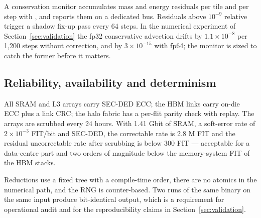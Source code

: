 A conservation monitor accumulates mass and energy residuals per tile and per step with
, and reports them on a dedicated bus. Residuals above $10^{-9}$ relative trigger
a shadow fix-up pass every 64 steps. In the numerical experiment of Section~\ref{sec:validation}
the fp32 conservative advection drifts by $1.1\times10^{-8}$ per 1,200 steps without correction,
and by $3\times10^{-15}$ with fp64; the monitor is sized to catch the former before it matters.

\subsection{Reliability, availability and determinism}
All SRAM and L3 arrays carry SEC-DED ECC; the HBM links carry on-die ECC plus a link CRC; the
halo fabric has a per-flit parity check with replay. The arrays are scrubbed every 24 hours. With
1.41 Gbit of SRAM, a soft-error rate of $2\times10^{-3}$ FIT/bit and SEC-DED, the correctable rate
is 2.8 M FIT and the residual uncorrectable rate after scrubbing is below 300 FIT --- acceptable
for a data-centre part and two orders of magnitude below the memory-system FIT of the HBM stacks.

Reductions use a fixed tree with a compile-time order, there are no atomics in the numerical path,
and the RNG is counter-based. Two runs of the same binary on the same input produce bit-identical
output, which is a requirement for operational audit and for the reproducibility claims in
Section~\ref{sec:validation}.
